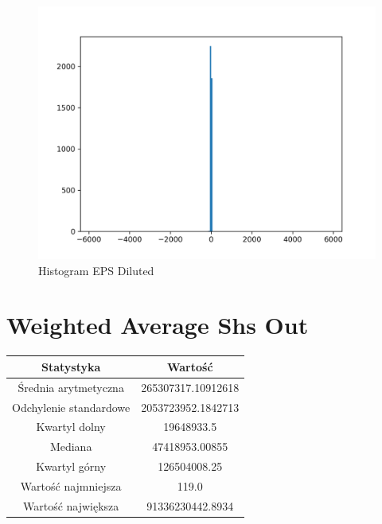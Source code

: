 \documentclass{article}
\begin{document}
\begin{figure}[h!]
    \includegraphics[width=\linewidth]{variables/EPS Diluted.png}
    \caption{Histogram EPS Diluted }
\end{figure}\section{ Weighted Average Shs Out }

\begin{center}
    \begin{tabular}{|c | c|} 
    \hline
    Statystyka & Wartość \\
    \hline\hline
    Średnia arytmetyczna & 265307317.10912618 \\ 
    \hline
    Odchylenie standardowe & 2053723952.1842713 \\
    \hline
    Kwartyl dolny & 19648933.5 \\
    \hline
    Mediana & 47418953.00855 \\
    \hline
    Kwartyl górny & 126504008.25 \\
    \hline
    Wartość najmniejsza & 119.0 \\
    \hline
    Wartość największa & 91336230442.8934 \\
    \hline
   \end{tabular}
\end{center}
\end{document}
